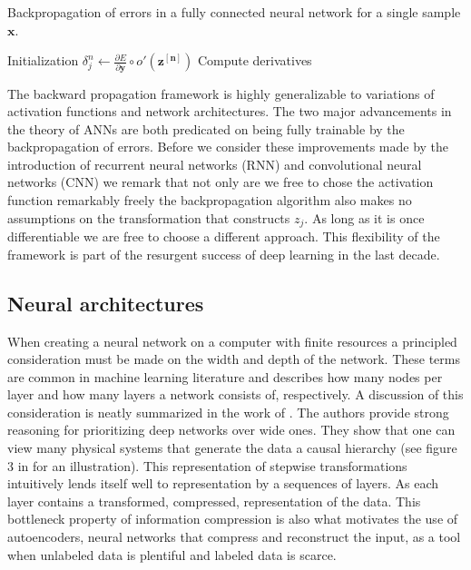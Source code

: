 \begin{algorithm}
\caption{Backpropagation of errors in a fully connected neural network for a single sample $\mathbf{x}$.}\label{algo:backprop}\label{algo:backprop}
Initialization\;
$\delta_j^{n} \gets \frac{\partial E}{\partial \mathbf{y}} \circ o'(\mathbf{z^{[n]}})$\;
Compute derivatives\;  
\end{algorithm}

The backward propagation framework is highly generalizable to variations of activation functions and network architectures. The two major advancements in the theory of ANNs are both predicated on being fully trainable by the backpropagation of errors. Before we consider these improvements made by the introduction of recurrent neural networks (RNN) and convolutional neural networks (CNN) we remark that not only are we free to chose the activation function remarkably freely the backpropagation algorithm also makes no assumptions on the transformation that constructs $z_j$. As long as it is once differentiable we are free to choose a different approach. This flexibility of the framework is part of the resurgent success of deep learning in the last decade. 

\subsection{Neural architectures}

When creating a neural network on a computer with finite resources a principled consideration must be made on the width and depth of the network. These terms are common in machine learning literature and describes how many nodes per layer and how many layers a network consists of, respectively. A discussion of this consideration is neatly summarized in the work of \citet{Lin2017}. The authors provide strong reasoning for prioritizing deep networks over wide ones. They show that one can view many physical systems that generate the data a causal hierarchy (see figure 3 in \citet{Lin2017} for an illustration). This representation of stepwise transformations intuitively lends itself well to representation by a sequences of layers. As each layer contains a transformed, compressed, representation of the data. This bottleneck property of information compression is also what motivates the use of autoencoders, neural networks that compress and reconstruct the input, as a tool when unlabeled data is plentiful and labeled data is scarce.

